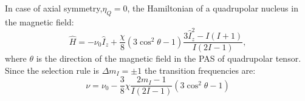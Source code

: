 \documentclass{beamer}
\begin{document}
\begin{frame}


	In case of axial symmetry,$\eta_Q = 0$, the Hamiltonian of a quadrupolar nucleus in the magnetic field:
	\begin{equation}
	   \hat{H} = - \nu_0 \hat{I}_z + \dfrac{\chi}{8} (3 \cos^2 \theta - 1) \dfrac{3 \hat{I}_z^2  -I(I+1) }{I(2I-1)},
	\end{equation}
	where $\theta$ is the direction of the magnetic field in the PAS of quadrupolar tensor. Since the selection rule is $\Delta m_I = \pm1$ the transition frequencies are:
	\begin{equation}
	  \nu = \nu_0 -\dfrac{3}{8} \chi \dfrac{2 m_I -1}{I(2I -1)}(3 \cos^2 \theta - 1)
	\end{equation}
	 
\end{frame}



%
%	
%	
%
%	
%	
%	
%	
\end{document}
